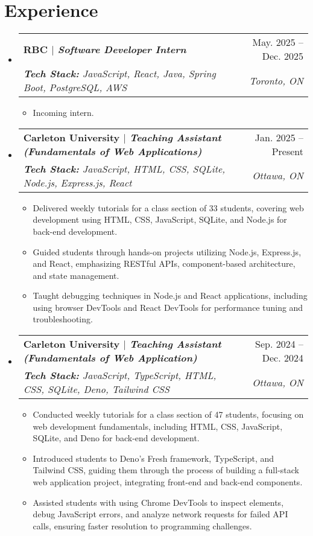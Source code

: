\documentclass[letterpaper,11pt]{article}
\makeatletter
\newcommand{\resumeItem}[1]{
  \item\small{
    {#1 \vspace{-2pt}}
  }
}
\newcommand{\resumeSubheading}[4]{
  \vspace{-2pt}\item
    \begin{tabular*}{0.97\textwidth}[t]{l@{\extracolsep{\fill}}r}
      \textbf{#1} & #2 \\
      \textit{\small#3} & \textit{\small #4} \\
    \end{tabular*}\vspace{-7pt}
}
\newcommand{\resumeSubHeadingListStart}{\begin{itemize}[leftmargin=0.15in, label={}]}
\newcommand{\resumeSubHeadingListEnd}{\end{itemize}}
\newcommand{\resumeItemListStart}{\begin{itemize}}
\newcommand{\resumeItemListEnd}{\end{itemize}\vspace{-5pt}}
\makeatother
\begin{document}
\section{Experience}
\resumeSubHeadingListStart
    \resumeSubheading{RBC\textnormal{ $|$ \textit{Software Developer Intern}}}{May. 2025 -- Dec. 2025}
    {{\textbf{Tech Stack:} JavaScript, React, Java, Spring Boot, PostgreSQL, AWS}}{Toronto, ON}
        \resumeItemListStart    
            \resumeItem{Incoming intern.}
        \resumeItemListEnd
    
    \resumeSubheading{Carleton University\textnormal{ $|$ \textit {Teaching Assistant (Fundamentals of Web Applications)}}}{Jan. 2025 -- Present}
    {{\textbf{Tech Stack:} JavaScript, HTML, CSS, SQLite, Node.js, Express.js, React}}{Ottawa, ON}
        \resumeItemListStart
            \resumeItem{Delivered weekly tutorials for a class section of 33 students, covering web development using HTML, CSS,
            JavaScript, SQLite, and Node.js for back-end development.}
            \resumeItem{Guided students through hands-on projects utilizing Node.js, Express.js, and React, emphasizing RESTful APIs,
            component-based architecture, and state management.}
            \resumeItem{Taught debugging techniques in Node.js and React applications, including using browser DevTools and React
            DevTools for performance tuning and troubleshooting.}
        \resumeItemListEnd

    \resumeSubheading{Carleton University\textnormal{ $|$ \textit{Teaching Assistant (Fundamentals of Web Application)}}}{Sep. 2024 -- Dec. 2024}
    {{\textbf{Tech Stack:} JavaScript, TypeScript, HTML, CSS, SQLite, Deno, Tailwind CSS}}{Ottawa, ON}
        \resumeItemListStart
            \resumeItem{Conducted weekly tutorials for a class section of 47 students, focusing on web development fundamentals, including
            HTML, CSS, JavaScript, SQLite, and Deno for back-end development.}
            \resumeItem{Introduced students to Deno’s Fresh framework, TypeScript, and Tailwind CSS, guiding them through the process
            of building a full-stack web application project, integrating front-end and back-end components.}
            \resumeItem{Assisted students with using Chrome DevTools to inspect elements, debug JavaScript errors, and analyze network
            requests for failed API calls, ensuring faster resolution to programming challenges.}
        \resumeItemListEnd
\resumeSubHeadingListEnd

\end{document}
